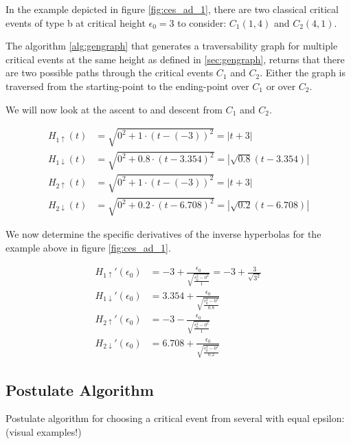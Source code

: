In the example depicted in figure \ref{fig:ces_ad_1}, there are two classical critical events of type b at critical height $\epsilon_0 = 3$ to consider: $C_1(1, 4)$ and $C_2(4, 1)$.

The algorithm \ref{alg:gengraph} that generates a traversability graph for multiple critical events at the same height as defined in \ref{sec:gengraph}, returns that there are two possible paths through the critical events $C_1$ and $C_2$. Either the graph is traversed from the starting-point to the ending-point over $C_1$ or over $C_2$.

We will now look at the ascent to and descent from $C_1$ and $C_2$.


\begin{align*}
	H_{1\uparrow}(t) &= \sqrt{0^2 + 1\cdot(t - (-3))^2} = \left| t + 3 \right|\\
	H_{1\downarrow}(t) &= \sqrt{0^2 + 0.8\cdot(t - 3.354)^2} = \left| \sqrt{0.8}(t - 3.354) \right|\\
	H_{2\uparrow}(t) &= \sqrt{0^2 + 1\cdot(t - (-3))^2} = \left| t + 3 \right|\\
	H_{2\downarrow}(t) &= \sqrt{0^2 + 0.2\cdot(t - 6.708)^2} = \left| \sqrt{0.2}(t - 6.708) \right|
\end{align*}

We now determine the specific derivatives of the inverse hyperbolas for the example above in figure \ref{fig:ces_ad_1}.

\begin{align*}
	H_{1\uparrow}'(\epsilon_0) &= -3 + \frac{ \epsilon_0 }{ \sqrt{\frac{\epsilon_0^2 - 0^2}{1}}} = -3 + \frac{3}{ \sqrt{3^2} }\\
	H_{1\downarrow}'(\epsilon_0) &= 3.354 + \frac{ \epsilon_0 }{ \sqrt{\frac{\epsilon_0^2 - 0^2}{0.8}}}\\
	H_{2\uparrow}'(\epsilon_0) &= -3 - \frac{ \epsilon_0 }{ \sqrt{\frac{\epsilon_0^2 - 0^2}{1}}}\\
	H_{2\downarrow}'(\epsilon_0) &= 6.708 + \frac{ \epsilon_0 }{ \sqrt{\frac{\epsilon_0^2 - 0^2}{0.2}}}
\end{align*}


\subsection{Postulate Algorithm}
Postulate algorithm for choosing a critical event from several with equal epsilon: (visual examples!)

